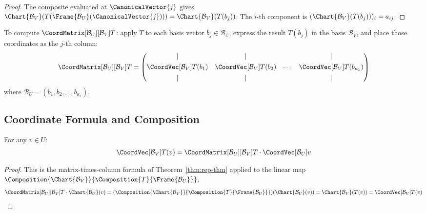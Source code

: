 \begin{proof}
    The composite evaluated at $\CanonicalVector{j}$ gives
    $\Chart{\mathcal{B}_V}(T(\Frame{\mathcal{B}_U}(\CanonicalVector{j})))
    = \Chart{\mathcal{B}_V}(T(b_j))$.
    The $i$-th component is
    $(\Chart{\mathcal{B}_V}(T(b_j)))_i = a_{ij}$.
\end{proof}

\begin{remark}
    To compute $\CoordMatrix[\mathcal{B}_U][\mathcal{B}_V]{T}$: apply $T$ to each basis vector
    $b_j \in \mathcal{B}_U$, express the result $T(b_j)$ in the basis $\mathcal{B}_V$,
    and place those coordinates as the $j$-th column:
    \[
        \CoordMatrix[\mathcal{B}_U][\mathcal{B}_V]{T}
        = \begin{pmatrix}
            \vert & \vert & & \vert \\[4pt]
            \CoordVec[\mathcal{B}_V]{T(b_1)} & \CoordVec[\mathcal{B}_V]{T(b_2)}
            & \cdots & \CoordVec[\mathcal{B}_V]{T(b_{\kappa_1})} \\[4pt]
            \vert & \vert & & \vert
        \end{pmatrix}
    \]
    where $\mathcal{B}_U = (b_1, b_2, \ldots, b_{\kappa_1})$.
\end{remark}

\subsection{Coordinate Formula and Composition}

\begin{corollary}
\label{prop:coord-formula}
    For any $v \in U$:
    \[
        \CoordVec[\mathcal{B}_V]{T(v)}
        = \CoordMatrix[\mathcal{B}_U][\mathcal{B}_V]{T}
          \cdot \CoordVec[\mathcal{B}_U]{v}
    \]
\end{corollary}

\begin{proof}
    This is the matrix-times-column formula of Theorem~\ref{thm:rep-thm} applied to the
    linear map
    $\Composition{\Chart{\mathcal{B}_V}}{\Composition{T}{\Frame{\mathcal{B}_U}}}$:
    \[
        \CoordMatrix[\mathcal{B}_U][\mathcal{B}_V]{T} \cdot \Chart{\mathcal{B}_U}(v)
        = (\Composition{\Chart{\mathcal{B}_V}}{\Composition{T}{\Frame{\mathcal{B}_U}}})
          (\Chart{\mathcal{B}_U}(v))
        = \Chart{\mathcal{B}_V}(T(v))
        = \CoordVec[\mathcal{B}_V]{T(v)} \qedhere
    \]
\end{proof}

